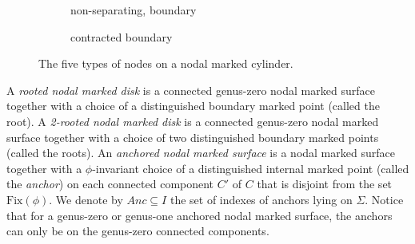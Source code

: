 \documentclass[11pt]{amsart}
\theoremstyle{definition}
\theoremstyle{remark}
\newcommand{\<}{\left<}
\renewcommand{\>}{\right>}
\numberwithin{equation}{section}
\begin{document}
\begin{figure}[h]
\begin{subfigure}{.3\textwidth}
\vspace{0.15cm}

  \caption{non-separating, boundary}
\end{subfigure}
\begin{subfigure}{.3\textwidth}
  \centering

\vspace{0.15cm}

  \caption{contracted boundary }
\end{subfigure}





\caption{The five types of nodes on a nodal marked cylinder.}
\label{fig node type}
\end{figure}

A \textit{rooted nodal marked disk} is a connected genus-zero nodal marked surface together with a choice of a distinguished boundary marked point (called the root). A \textit{2-rooted nodal marked disk} is a connected genus-zero nodal marked surface together with a choice of two distinguished boundary marked points (called the roots). An \textit{anchored nodal marked surface} is a nodal marked surface together with a $\phi$-invariant choice of a distinguished internal marked point (called the \textit{anchor}) on each connected component $C'$ of $C$ that is disjoint from the set $\text{Fix}(\phi)$. We denote by $Anc\subseteq I$ the set of indexes of anchors lying on $\Sigma$. Notice that for a genus-zero or genus-one anchored nodal marked surface, the anchors can only be on the genus-zero connected components.
\end{document}
